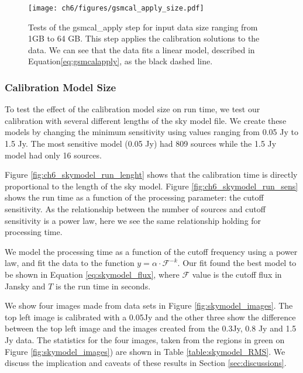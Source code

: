 \begin{figure}
\texttt{[image: ch6/figures/gsmcal\_apply\_size.pdf]}
        \caption{\small Tests of the {\selectfont gsmcal\_apply} step for input data size ranging from 1GB to 64 GB. This step applies the calibration solutions to the data. We can see that the data fits a linear model, described in Equation\ref{eq:gsmcalapply}, as the black dashed line.}
            \label{fig:ch6_gsmcalapply_size}
\end{figure}

\subsubsection{Calibration Model Size}
To test the effect of the calibration model size on run time, we test our calibration with several different lengths of the sky model file. We create these models by changing the minimum sensitivity using values ranging from 0.05 Jy to 1.5 Jy. The most sensitive model (0.05 Jy) had 809 sources while the 1.5 Jy model had only 16 sources. 

Figure \ref{fig:ch6_skymodel_run_lenght} shows that the calibration time is directly proportional to the length of the sky model. Figure \ref{fig:ch6_skymodel_run_sens} shows the run time as a function of the processing parameter: the cutoff sensitivity. As the relationship between the number of sources and cutoff sensitivity is a power law, here we see the same relationship holding for processing time.

We model the processing time as a function of the cutoff frequency using a power law, and fit the data to the function $y=\alpha\cdot \mathcal{F}^{-k}$. Our fit found the best model to be shown in Equation \ref{eq:skymodel_flux}, where $\mathcal{F}$ value is the cutoff flux in Jansky and $T$ is the run time in seconds. 

We show four images made from data sets in Figure \ref{fig:skymodel_images}. The top left image is calibrated with a 0.05Jy and the other three show the difference between the top left image and the images created from the 0.3Jy, 0.8 Jy and 1.5 Jy data. The statistics for the four images, taken from the regions in green on Figure \ref{fig:skymodel_images}) are shown in Table \ref{table:skymodel_RMS}. We discuss the implication and caveats of these results in Section \ref{sec:discussions}.


